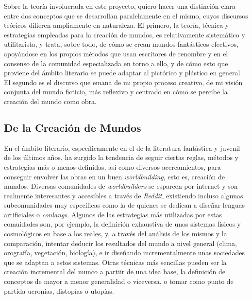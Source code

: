 \documentclass[twoside]{article}
\begin{document}
\begin{multicols}{2}
  Sobre la teoría involucrada en este proyecto, quiero hacer una
  distinción clara entre dos conceptos que se desarrollan paralelamente en
  el mismo, cuyos discursos teóricos difieren ampliamente en naturaleza.
  El primero, la teoría, técnica y estrategias empleadas para la creación
  de mundos, es relativamente sistemático y utilitarista, y trata, sobre
  todo, de cómo se crean mundos fantásticos efectivos, apoyándose en los
  propios métodos que usan escritores de renombre y en el consenso de la
  comunidad especializada en torno a ello, y de cómo esto que proviene del
  ámbito literario se puede adaptar al pictórico y plástico en general. El
  segundo es el discurso que emana de mi propio proceso creativo, de mi
  visión conjunta del mundo ficticio, más reflexivo y centrado en cómo se
  percibe la creación del mundo como obra.

  \hypertarget{de-la-creaciuxf3n-de-mundos}{%
    \subsection{De la Creación de
      Mundos}\label{de-la-creaciuxf3n-de-mundos}}

  En el ámbito literario, específicamente en el de la literatura
  fantástica y juvenil de los últimos años, ha surgido la tendencia de
  seguir ciertas reglas, métodos y estrategias más o menos definidas, así
  como diversos acercamientos, para conseguir envolver las obras en un
  buen \emph{worldbuilding}, esto es, creación de mundos. Diversas
  comunidades de \emph{worldbuilders}\autocite*{worldbuilding} se esparcen por internet y 
  son realmente interesantes y accesibles a través de \emph{Reddit}, existiendo incluso 
  algunas subcomunidades muy específicas como la de quienes se dedican a diseñar lenguas 
  artificiales o \emph{conlangs}\autocite*{conlangs}. Algunos de las estrategias más 
  utilizadas por estas comuidades son, por ejemplo, la definición exhaustiva de unos 
  sistemas físicos y cosmológicos en base a los reales, y, a través del análisis de los 
  mismos y la comparación, intentar deducir los resultados del mundo a nivel general (clima, 
  orografía, vegetación, biología), e ir diseñando incrementalmente unas sociedades que se 
  adaptan a estos sistemas. Otras técnicas más sencillas pueden ser la creación incremental 
  del munco a partiir de una idea base, la definición de conceptos de mayor a menor 
  generalidad o viceversa, o tomar como punto de partida ucronías, distopías o utopías.


\end{multicols}
\end{document}
